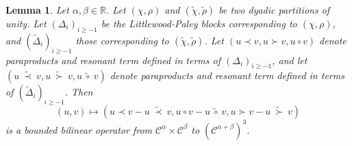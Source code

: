 \documentclass[11pt,a4paper]{article}
\newtheorem{lemma}[theorem]{Lemma}
\theoremstyle{remark}
\newcommand{\R}{\mathbb{R}}
\newcommand{\CC}{\ensuremath{\mathscr{C}}}
\begin{document}
\begin{lemma}\label{l:paraproduct difference is bounded operator}
   Let $\alpha, \beta \in \R$. Let $( \chi, \rho )$ and $( \tilde{\chi}, \tilde{\rho} )$ be two dyadic partitions of unity. Let $(\Delta_i)_{i \ge -1}$ be the Littlewood-Paley blocks corresponding to $( \chi, \rho )$, and $(\widetilde{\Delta}_i)_{i \ge -1}$ those corresponding to $( \tilde{\chi}, \tilde{\rho} )$. Let $(u \prec v, u \succ v, u \circ v)$ denote paraproducts and resonant term defined in terms of $(\Delta_i)_{i \ge -1}$, and let $(u \ \widetilde{\prec}\ v, u \ \widetilde{\succ} \ v, u\ \widetilde{\circ}\ v)$ denote paraproducts and resonant term defined in terms of $(\widetilde{\Delta}_i)_{i \ge -1}$.
Then
   \[
      (u,v) \mapsto ( u \prec v - u \ \widetilde{\prec} \ v, u \circ v - u \ \widetilde{\circ} \ v, u \succ v - u \ \widetilde{\succ} \ v)
   \]
   is a bounded bilinear operator from $\CC^\alpha \times \CC^\beta$ to $(\CC^{\alpha+\beta})^3$.%
\end{lemma}
\end{document}
